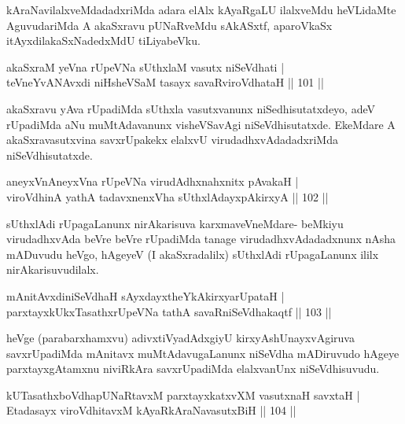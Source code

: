 \begin{artha}
kAraNavilalxveMdadadxriMda adara elAlx kAyaRgaLU ilalxveMdu heVLidaMte AguvudariMda A akaSxravu pUNaRveMdu sAkASxtf, aparoVkaSx itAyxdi\break lakaSxNadedxMdU tiLiyabeVku.
\end{artha}

\begin{shl}
akaSxraM yeVna rUpeVNa sUthxlaM vasutx niSeVdhati |\\
teVneYvANAvxdi niHsheVSaM tasayx savaRviroVdhataH \hfill || 101 ||
\end{shl}

\begin{artha}
akaSxravu yAva rUpadiMda sUthxla vasutxvanunx niSedhisutatxdeyo, adeV rUpadiMda aNu muMtAdavanunx visheVSavAgi niSeVdhisutatxde. EkeMdare A akaSxravasutxvina savxrUpakekx elalxvU virudadhxvAdadadxriMda niSeVdhisutatxde.
\end{artha}

\begin{shl}
aneyxVnAneyxVna rUpeVNa virudAdhxnahxnitx pAvakaH |\\
viroVdhinA yathA tadavxnenxVha sUthxlAdayxpAkirxyA \hfill || 102 ||
\end{shl}

\begin{artha}%
sUthxlAdi rUpagaLanunx nirAkarisuva karxmaveVneMdare- beMkiyu virudadhxvAda beVre beVre rUpadiMda tanage virudadhxvAdadadxnunx nAsha mADuvudu heVgo, hAgeyeV (I akaSxradalilx) sUthxlAdi rUpagaLanunx ililx nirAkarisuvudilalx.
\end{artha}

\begin{shl}
mAnitAvxdiniSeVdhaH sAyxdayxtheYkAkirxyarUpataH |\\
parxtayxkUkxTasathxrUpeVNa tathA savaRniSeVdhakaqtf \hfill || 103 ||
\end{shl}

\begin{artha}
heVge (parabarxhamxvu) adivxtiVyadAdxgiyU kirxyAshUnayxvAgiruva savxrUpadiMda mAnitavx muMtAdavugaLanunx niSeVdha mADiruvudo hAgeye parxtayxgAtamxnu niviRkAra savxrUpadiMda elalxvanUnx niSeVdhisuvudu.
\end{artha}


\begin{shl}
kUTasathxboVdhapUNaRtavxM parxtayxkatxvXM vasutxnaH savxtaH |\\
Etadasayx viroVdhitavxM kAyaRkAraNavasutxBiH \hfill || 104 ||
\end{shl}


